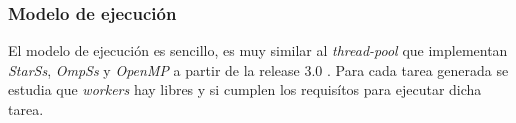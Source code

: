 \documentclass[a4paper]{article}
\begin{document}

\subsubsection{Modelo de ejecución}

El modelo de ejecución es sencillo, es muy similar al \textit{thread-pool} que implementan \textit{StarSs}, \textit{OmpSs} y \textit{OpenMP} a partir de la release 3.0 \cite{ayguade2009design}. Para cada tarea generada se estudia que \textit{workers} hay libres y si cumplen los requisítos para ejecutar dicha tarea.
\end{document}
